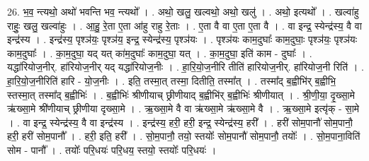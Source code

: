 \documentclass[17pt]{extarticle}
\begin{document}
26. भ॒व॒ न्त्यथो॒ अथो॑ भवन्ति भव॒ न्त्यथो᳚ । . अथो॒ खलु॒ खल्वथो॒ अथो॒ खलु॑ । . अथो॒ इत्यथो᳚ । . खल्वा॑हु राहुः॒ खलु॒ खल्वा॑हुः । . आ॒हु॒ रे॒ता ए॒ता आ॑हु राहु रे॒ताः । . ए॒ता वै वा ए॒ता ए॒ता वै । . वा इन्द्र॒ स्येन्द्र॑स्य॒ वै वा इन्द्र॑स्य । . इन्द्र॑स्य॒ पृश्ञ॑यः॒ पृश्ञ॑य॒ इन्द्र॒ स्येन्द्र॑स्य॒ पृश्ञ॑यः । . पृश्ञ॑यः काम॒दुघाः᳚ काम॒दुघाः॒ पृश्ञ॑यः॒ पृश्ञ॑यः काम॒दुघाः᳚ । . का॒म॒दुघा॒ यद् यत् का॑म॒दुघाः᳚ काम॒दुघा॒ यत् । . का॒म॒दुघा॒ इति॑ काम - दुघाः᳚ । . यद्धा॑रियोज॒नीर्. हा॑रियोज॒नीर् यद् यद्धा॑रियोज॒नीः । . हा॒रि॒यो॒ज॒नीरि तीति॑ हारियोज॒नीर्. हा॑रियोज॒नी रिति॑ । . हा॒रि॒यो॒ज॒नीरिति॑ हारि - यो॒ज॒नीः । . इति॒ तस्मा॒त् तस्मा॒ दितीति॒ तस्मा᳚त् । . तस्मा᳚द् ब॒ह्वीभि॑र् ब॒ह्वीभि॒ स्तस्मा॒त् तस्मा᳚द् ब॒ह्वीभिः॑ । . ब॒ह्वीभिः॑ श्रीणीयाच् छ्रीणीयाद् ब॒ह्वीभि॑र् ब॒ह्वीभिः॑ श्रीणीयात् । . श्री॒णी॒या॒ दृ॒ख्सा॒मे ऋ॑ख्सा॒मे श्री॑णीयाच् छ्रीणीया दृख्सा॒मे । . ऋ॒ख्सा॒मे वै वा ऋ॑ख्सा॒मे ऋ॑ख्सा॒मे वै । . ऋ॒ख्सा॒मे इत्यृ॑क् - सा॒मे । . वा इन्द्र॒ स्येन्द्र॑स्य॒ वै वा इन्द्र॑स्य । . इन्द्र॑स्य॒ हरी॒ हरी॒ इन्द्र॒ स्येन्द्र॑स्य॒ हरी᳚ । . हरी॑ सोम॒पानौ॑ सोम॒पानौ॒ हरी॒ हरी॑ सोम॒पानौ᳚ । . हरी॒ इति॒ हरी᳚ । . सो॒म॒पानौ॒ तयो॒ स्तयोः᳚ सोम॒पानौ॑ सोम॒पानौ॒ तयोः᳚ । . सो॒म॒पाना॒विति॑ सोम - पानौ᳚ । . तयोः᳚ परि॒धयः॑ परि॒धय॒ स्तयो॒ स्तयोः᳚ परि॒धयः॑ । \newline
\end{document}
